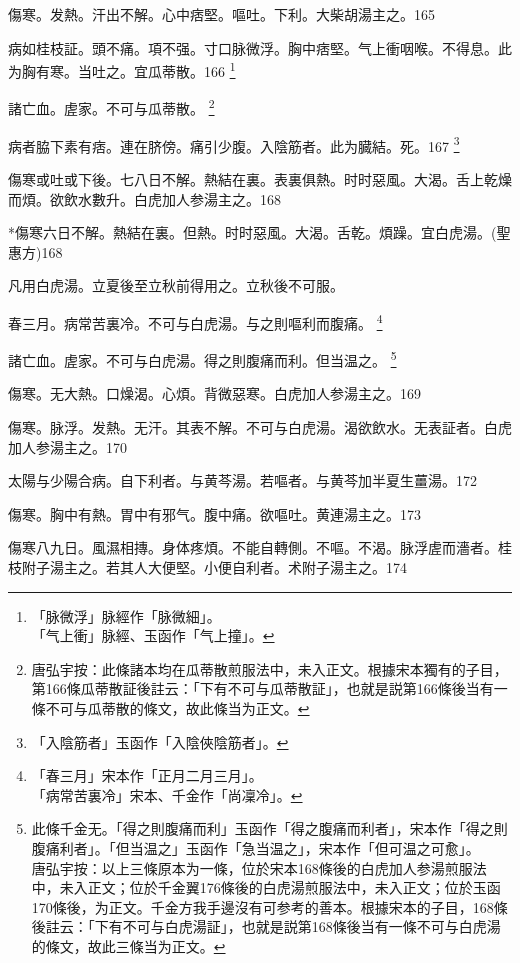 傷寒。发熱。汗出不解。心中痞堅。嘔吐。下利。大柴胡湯主之。165

病如桂枝証。頭不痛。項不强。寸{\khaaitp 口}脉微浮。胸中痞堅。气上衝咽喉。不得息。此为胸有寒。当吐之。宜瓜蒂散。166
	\footnote{「脉微浮」脉經作「脉微細」。\\「气上衝」脉經、玉函作「气上撞」。}

諸亡血。虗家。不可与瓜蒂散。
	\footnote{唐弘宇按：此條諸本均在瓜蒂散煎服法中，未入正文。根據宋本獨有的子目，第166條瓜蒂散証後註云：「下有不可与瓜蒂散証」，也就是説第166條後当有一條不可与瓜蒂散的條文，故此條当为正文。}

病者脇下素有痞。連在脐傍。痛引少腹。入陰筋者。此为臓結。死。167
	\footnote{「入陰筋者」玉函作「入陰俠陰筋者」。}

傷寒或吐或下後。七八日不解。熱結在裏。表裏俱熱。时时惡風。大渴。舌上乾燥而煩。欲飲水數升。白虎{\khaaitp 加人参}湯主之。168

*傷寒六日不解。熱結在裏。但熱。时时惡風。大渴。舌乾。煩躁。宜白虎湯。(聖惠方)168

凡用白虎湯。立夏後至立秋前得用之。立秋後不可服。

春三月。病常苦裏冷。不可与白虎湯。与之則嘔利而腹痛。
	\footnote{「春三月」宋本作「正月二月三月」。\\「病常苦裏冷」宋本、千金作「尚凜冷」。}

諸亡血。虗家。不可与白虎湯。得之則腹痛而利。但当温之。
	\footnote{此條千金无。「得之則腹痛而利」玉函作「得之腹痛而利者」，宋本作「得之則腹痛利者」。「但当温之」玉函作「急当温之」，宋本作「但可温之可愈」。\\唐弘宇按：以上三條原本为一條，位於宋本168條後的白虎加人参湯煎服法中，未入正文；位於千金翼176條後的白虎湯煎服法中，未入正文；位於玉函170條後，为正文。千金方我手邊沒有可参考的善本。根據宋本的子目，168條後註云：「下有不可与白虎湯証」，也就是説第168條後当有一條不可与白虎湯的條文，故此三條当为正文。}

傷寒。无大熱。口燥渴。心煩。背微惡寒。白虎{\khaaitp 加人参}湯主之。169

傷寒。脉浮。发熱。无汗。其表不解。不可与白虎湯。渴欲飲水。无表証者。白虎{\khaaitp 加人参}湯主之。170

太陽与少陽合病。自下利者。与黄芩湯。若嘔者。与黄芩加半夏生薑湯。172

傷寒。胸中有熱。胃中有邪气。腹中痛。欲嘔吐。黄連湯主之。173

傷寒八九日。風濕相摶。身体疼煩。不能自轉側。不嘔。不渴。脉浮虗而濇者。桂枝附子湯主之。若其人大便堅。小便自利者。术附子湯主之。174

